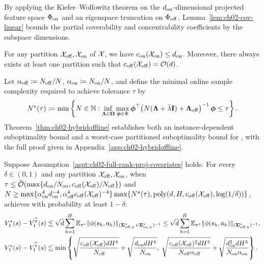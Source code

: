 By applying the Kiefer--Wolfowitz theorem \citep{lattimore2020learning} on the $d_{{\operatorname{on}}}$-dimensional projected feature space $\Phi_{{\operatorname{on}}}$ and an eigenspace truncation on $\Phi_{{\operatorname{off}}}$, Lemma~\ref{lem:ch02-cov-linear} bounds the partial coverability and concentrability coefficients by the subspace dimensions.

\begin{lem}
\label{lem:ch02-cov-linear}
For any partition ${\mathcal{X}}_{{\operatorname{off}}}, {\mathcal{X}}_{{\operatorname{on}}}$ of ${\mathcal{X}}$, we have $c_{{\operatorname{on}}}({\mathcal{X}}_{{\operatorname{on}}}) \leq d_{{\operatorname{on}}}$. Moreover, there always exists at least one partition such that $c_{{\operatorname{off}}}({\mathcal{X}}_{{\operatorname{off}}}) = {\mathcal{O}}(d)$.
\end{lem}

Let $\alpha_{{\operatorname{off}}} \coloneqq N_{{\operatorname{off}}}/N$, $\alpha_{{\operatorname{on}}} \coloneqq N_{{\operatorname{on}}}/N$, and define the minimal online sample complexity required to achieve tolerance $\tau$ by
\begin{equation}
    N^\star(\tau) \coloneqq \min \left\{ N \in {\mathbb{N}} : \inf_{\boldsymbol{\Lambda} \in \boldsymbol{\Omega}} \max_{\boldsymbol{\phi} \in \Phi} \boldsymbol{\phi}^{\top}\!\left(N(\boldsymbol{\Lambda}+\bar{\lambda} \mathbf{I})+\boldsymbol{\Lambda}_{\mathrm{off}}\right)^{-1} \boldsymbol{\phi} \leq \tau \right\}.
\end{equation}
Theorem~\ref{thm:ch02-hybridoffline} establishes both an instance-dependent suboptimality bound and a worst-case partitioned suboptimality bound for , with the full proof given in Appendix~\ref{app:ch02-hybridoffline}.

\begin{thm}
\label{thm:ch02-hybridoffline}
Suppose Assumption~\ref{aspt:ch02-full-rank-proj-covariates} holds. For every $\delta \in (0,1)$ and any partition ${\mathcal{X}}_{{\operatorname{off}}}, {\mathcal{X}}_{{\operatorname{on}}}$, when $\tau \leq \tilde{{\mathcal{O}}}(\max\{d_{{\operatorname{on}}}/N_{{\operatorname{on}}}, c_{{\operatorname{off}}}({\mathcal{X}}_{{\operatorname{off}}})/N_{{\operatorname{off}}}\})$ and $N \geq \max\{\alpha_{{\operatorname{on}}}^{4} d_{{\operatorname{on}}}^{-4}, \alpha_{{\operatorname{off}}}^{4} c_{{\operatorname{off}}}({\mathcal{X}}_{{\operatorname{off}}})^{-4}\}\max\{N^\star(\tau), \operatorname{poly}(d, H, c_{{\operatorname{off}}}({\mathcal{X}}_{{\operatorname{off}}}), \log(1/\delta))\}$,  achieves with probability at least $1-\delta$:
\begin{align}
    V_1^\star(s)-V_1^{\widehat{\pi}}(s) &\lesssim \sqrt{d}\sum_{h=1}^H \mathbb{E}_{\pi^\star}\|\phi(s_h, a_h)\|_{(\boldsymbol{\Sigma}_{{\operatorname{off}},h}^{\star}+ \boldsymbol{\Sigma}_{{\operatorname{on}},h}^\star)^{-1}}\leq \sqrt{d}\sum_{h=1}^H \mathbb{E}_{\pi^\star}\|\phi(s_h, a_h)\|_{(\boldsymbol{\Sigma}_{{\operatorname{off}},h}^{\star})^{-1}}, \label{eqn:ch02-rappel-res1}\\
    V_1^\star(s)-V_1^{\widehat{\pi}}(s) &\lesssim \min\left\{\sqrt{\frac{c_{{\operatorname{off}}}({\mathcal{X}}_{{\operatorname{off}}})dH^{4}}{N_{{\operatorname{off}}}}} + \sqrt{\frac{d_{{\operatorname{on}}}dH^{4}}{N_{{\operatorname{on}}}}},\; \sqrt{\frac{c_{{\operatorname{off}}}({\mathcal{X}}_{{\operatorname{off}}})^2dH^3}{N_{{\operatorname{off}}}\alpha_{{\operatorname{off}}}}} + \sqrt{\frac{d_{{\operatorname{on}}}^2dH^3}{N_{{\operatorname{on}}}\alpha_{{\operatorname{on}}}}}\right\}. \label{eqn:ch02-rappel-res2}
\end{align}
\end{thm}

